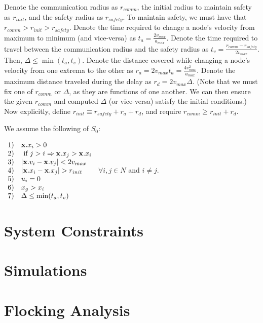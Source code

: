 \documentclass[10pt, conference, compsocconf]{IEEEtran}
\begin{document}
Denote the communication radius as $r_{comm}$, the initial radius to maintain safety as $r_{init}$, and the safety radius as $\mathit{r_{safety}}$.  To maintain safety, we must have that $r_{comm} > r_{init} > \mathit{r_{safety}}$.
%
Denote the time required to change a node's velocity from maximum to minimum (and vice-versa) as $t_a = \frac{2v_{max}}{a_{max}}$.  Denote the time required to travel between the communication radius and the safety radius as $t_v = \frac{r_{comm} - \mathit{r_{safety}}}{2v_{max}}$.  Then, $\Delta \leq \min(t_a, t_v)$.
%
Denote the distance covered while changing a node's velocity from one extrema to the other as $r_a = 2v_{max}t_a = \frac{4v_{max}^2}{a_{max}}$.  Denote the maximum distance traveled during the delay as $r_d = 2v_{max}\Delta$.
%
(Note that we must fix one of $r_{comm}$ or $\Delta$, as they are functions of one another.  We can then ensure the given $r_{comm}$ and computed $\Delta$ (or vice-versa) satisfy the initial conditions.)
%
Now explicitly, define $r_{init} \equiv \mathit{r_{safety}} + r_a + r_d$, and require $r_{comm} \geq r_{init} + r_d$.

We assume the following of $S_0$:

$ \begin{array}{ll}
		1) & {\bf x}.x_i > 0 \\
		2) & \textrm{ if } j > i \Rightarrow {\bf x}.x_j > {\bf x}.x_i \\
		3) & \lvert{\bf x}.v_i - {\bf x}.v_{j}\rvert < 2v_{max} \\
		4) & \lvert{\bf x}.x_i - {\bf x}.x_{j}\rvert > r_{init} \\
		5) & u_i = 0 \\
		6) & x_g > x_i \\
		7) & \Delta \leq \min(t_a, t_v)
	\end{array} $
$\forall i, j \in N$ and $i \neq j$.

\section{System Constraints}
\label{sec:constraints}

\section{Simulations}
\label{sec:simulations}

\section{Flocking Analysis}
\label{sec:flocking}
\end{document}
